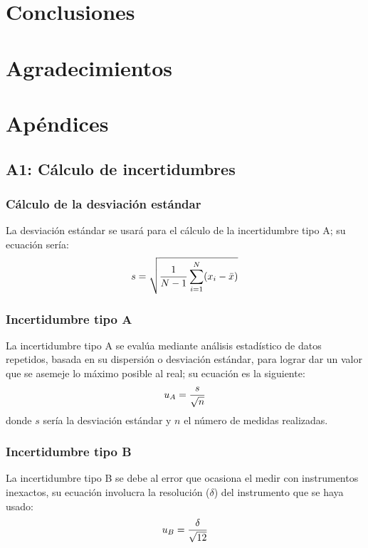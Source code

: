 \documentclass[10pt,onecolumn]{article}
\begin{document}

\tableofcontents %
\newpage

\HRule{0.5pt} %

\begin{abstract}

\end{abstract}


\section{Conclusiones}


\section{Agradecimientos}

\newpage
\section{Apéndices}
\subsection{A1: Cálculo de incertidumbres} 
\subsubsection{Cálculo de la desviación estándar}
La desviación estándar se usará para el cálculo de la incertidumbre tipo A; su ecuación sería:
\begin{equation}\centering
    s = \sqrt{\dfrac{1}{N - 1} \sum_{i=1}^{N} (x_i - \bar{x})}
\end{equation}

\subsubsection{Incertidumbre tipo A}
La incertidumbre tipo A se evalúa mediante análisis estadístico de datos repetidos, basada en su dispersión o desviación estándar, para lograr dar un valor que se asemeje lo máximo posible al real; su ecuación es la siguiente:
\begin{equation}\centering
u_A = \dfrac{s}{\sqrt{n}}
\end{equation}
donde $s$ sería la desviación estándar y $n$ el número de medidas realizadas.

\subsubsection{Incertidumbre tipo B}
La incertidumbre tipo B se debe al error que ocasiona el medir con instrumentos inexactos, su ecuación involucra la resolución ($\delta$) del instrumento que se haya usado:
\begin{equation}\centering
    u_B = \dfrac{\delta}{\sqrt{12}}
\end{equation}
\end{document}
